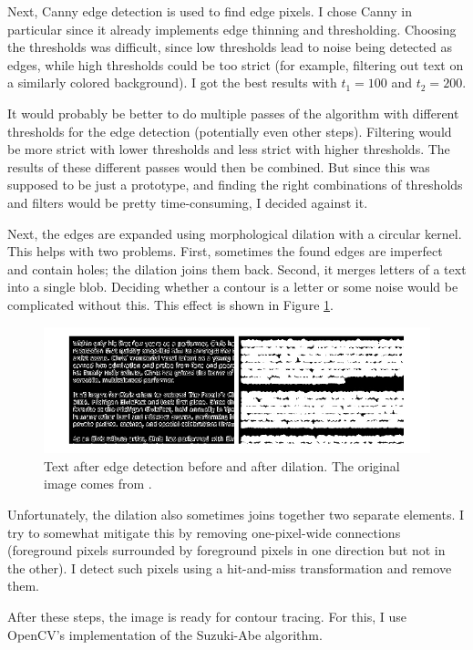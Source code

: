 \documentclass[
  digital,     %
  oneside,     %
  nosansbold,  %
  nocolorbold, %
  lof,         %
  lot,         %
]{fithesis4}
\begin{document}
Next, Canny edge detection is used to find edge pixels. I chose Canny in particular since it already implements edge thinning and thresholding. Choosing the thresholds was difficult, since low thresholds lead to noise being detected as edges, while high thresholds could be too strict (for example, filtering out text on a similarly colored background). I got the best results with $t_1=100$ and $t_2=200$.

It would probably be better to do multiple passes of the algorithm with different thresholds for the edge detection (potentially even other steps). Filtering would be more strict with lower thresholds and less strict with higher thresholds. The results of these different passes would then be combined. But since this was supposed to be just a prototype, and finding the right combinations of thresholds and filters would be pretty time-consuming, I decided against it.

Next, the edges are expanded using morphological dilation with a circular kernel. This helps with two problems. First, sometimes the found edges are imperfect and contain holes; the dilation joins them back. Second, it merges letters of a text into a single blob. Deciding whether a contour is a letter or some noise would be complicated without this. This effect is shown in Figure \ref{fig:dilation}.

\begin{figure}
    \centering
    \includegraphics[width=1\linewidth]{diagrams/dilation.pdf}
    \caption{Text after edge detection before and after dilation. The original image comes from \cite{aydos2020}.}
    \label{fig:dilation}
\end{figure}

Unfortunately, the dilation also sometimes joins together two separate elements. I try to somewhat mitigate this by removing one-pixel-wide connections (foreground pixels surrounded by foreground pixels in one direction but not in the other). I detect such pixels using a hit-and-miss transformation and remove them.

After these steps, the image is ready for contour tracing. For this, I use OpenCV's implementation of the Suzuki-Abe algorithm.
\end{document}
